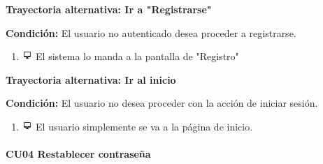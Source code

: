 \textbf{Trayectoria alternativa: Ir a "Registrarse"}

\vspace{0.3em}

\textbf{Condición:} El usuario no autenticado desea proceder a registrarse.
\begin{enumerate}
\item \includegraphics[height=1em]{pictures/sistema.png} El sistema lo manda a la pantalla de "Registro"
\end{enumerate} \bigskip

\textbf{Trayectoria alternativa: Ir al inicio} 

\vspace{0.3em}

\textbf{Condición:} El usuario no desea proceder con la acción de iniciar sesión.
\begin{enumerate}
\item \includegraphics[height=1em]{pictures/sistema.png} El usuario simplemente se va a la página de inicio.
\end{enumerate} \bigskip


\paragraph{CU04 Restablecer contraseña}

